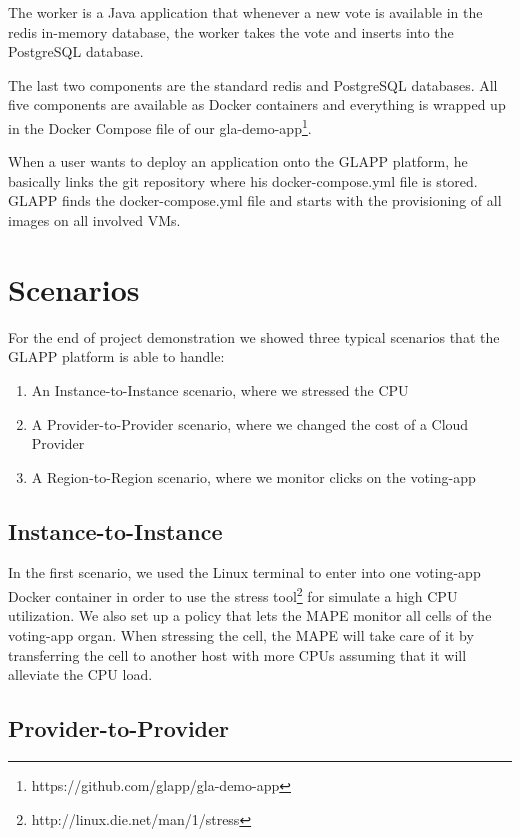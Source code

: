 \documentclass{seal_thesis}
\begin{document}
The worker is a Java application that whenever a new vote is available in the redis in-memory database, the worker takes the vote and inserts into the PostgreSQL database.

The last two components are the standard redis and PostgreSQL databases.
All five components are available as Docker containers and everything is wrapped up in the Docker Compose file of our gla-demo-app\footnote{https://github.com/glapp/gla-demo-app}.

When a user wants to deploy an application onto the GLAPP platform, he basically links the git repository where his docker-compose.yml file is stored.
GLAPP finds the docker-compose.yml file and starts with the provisioning of all images on all involved VMs.

\section{Scenarios}
For the end of project demonstration we showed three typical scenarios that the GLAPP platform is able to handle:
\begin{enumerate}
	\item An Instance-to-Instance scenario, where we stressed the CPU
	\item A Provider-to-Provider scenario, where we changed the cost of a Cloud Provider
	\item A Region-to-Region scenario, where we monitor clicks on the voting-app
\end{enumerate}

\subsection{Instance-to-Instance}

In the first scenario, we used the Linux terminal to enter into one voting-app Docker container in order to use the stress tool\footnote{http://linux.die.net/man/1/stress} for simulate a high CPU utilization.
We also set up a policy that lets the MAPE monitor all cells of the voting-app organ. When stressing the cell, the MAPE will take care of it by transferring the cell to another host with more CPUs assuming that it will alleviate the CPU load.

\subsection{Provider-to-Provider}
\end{document}
